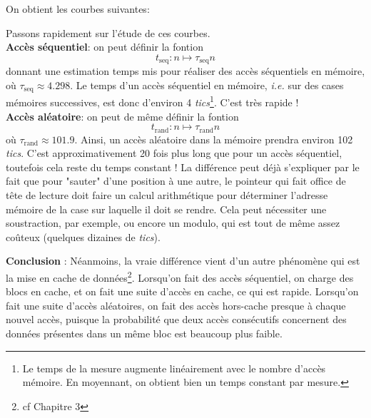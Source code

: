 \documentclass[11pt, a4 paper]{article}
\begin{document}
On obtient les courbes suivantes:
\begin{center}
\end{center}
Passons rapidement sur l'étude de ces courbes.\\
\textbf{Accès séquentiel}: on peut définir la fontion
\begin{equation*}
    t_{\text{seq}} \colon n \mapsto \tau_\text{seq} n
\end{equation*}
donnant une estimation temps mis pour réaliser des accès séquentiels en mémoire, où $\tau_\text{seq} \approx 4.298$.
Le temps d'un accès séquentiel en mémoire, \textit{i.e.} sur des cases mémoires successives, est donc d'environ 4 \textit{tics}\footnote{Le temps de la mesure augmente linéairement avec le nombre d'accès mémoire.
En moyennant, on obtient bien un temps constant par mesure.}. C'est très rapide !\\

\noindent
\textbf{Accès aléatoire}: on peut de même définir la fontion
\begin{equation*}
    t_{\text{rand}} \colon n \mapsto \tau_\text{rand} n
\end{equation*}
où $\tau_\text{rand} \approx 101.9$. Ainsi, un accès aléatoire dans la mémoire prendra environ 102 \textit{tics}.
C'est approximativement 20 fois plus long que pour un accès séquentiel, toutefois cela reste du temps constant !
La différence peut déjà s'expliquer par le fait que pour "sauter" d'une position à une autre, le pointeur qui fait office de tête de lecture doit faire un calcul arithmétique pour déterminer l'adresse mémoire de la case sur laquelle il doit se rendre.
Cela peut nécessiter une soustraction, par exemple, ou encore un modulo, qui est tout de même assez coûteux (quelques dizaines de \textit{tics}).

\begin{framed}
    \textbf{Conclusion} :
    Néanmoins, la vraie différence vient d'un autre phénomène qui est la mise en cache de données\footnote{cf Chapitre 3}.
    Lorsqu'on fait des accès séquentiel, on charge des blocs en cache, et on fait une suite d'accès en cache, ce qui est rapide.
    Lorsqu'on fait une suite d'accès aléatoires, on fait des accès hors-cache presque à chaque nouvel accès, puisque la probabilité que deux accès consécutifs concernent des données présentes dans un même bloc est beaucoup plus faible.
\end{framed}
\end{document}
